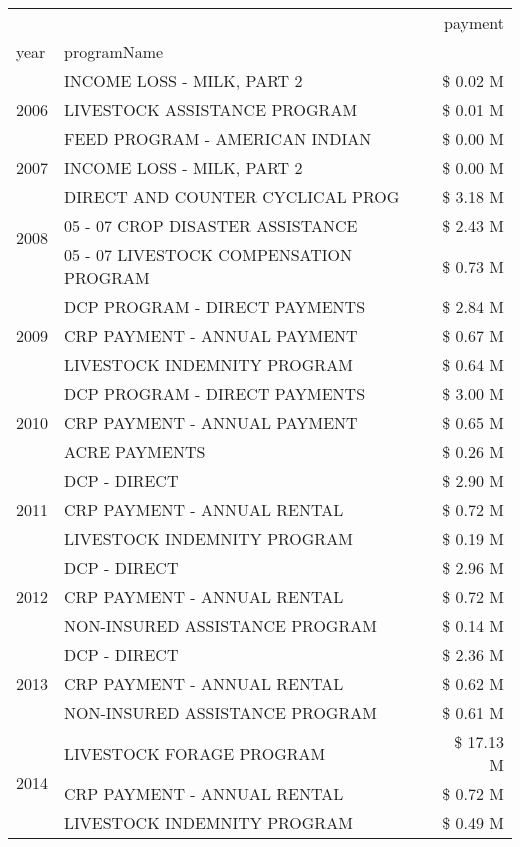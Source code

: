 \begin{tabular}{llr}
\toprule
 &  & payment \\
year & programName &  \\
\midrule
\multirow[t]{3}{*}{2006} & INCOME LOSS - MILK, PART 2 & \$ 0.02 M \\
 & LIVESTOCK ASSISTANCE PROGRAM & \$ 0.01 M \\
 & FEED PROGRAM - AMERICAN INDIAN & \$ 0.00 M \\
\cline{1-3}
2007 & INCOME LOSS - MILK, PART 2 & \$ 0.00 M \\
\cline{1-3}
\multirow[t]{3}{*}{2008} & DIRECT AND COUNTER CYCLICAL PROG & \$ 3.18 M \\
 & 05 - 07 CROP DISASTER ASSISTANCE & \$ 2.43 M \\
 & 05 - 07 LIVESTOCK COMPENSATION PROGRAM & \$ 0.73 M \\
\cline{1-3}
\multirow[t]{3}{*}{2009} & DCP PROGRAM - DIRECT PAYMENTS & \$ 2.84 M \\
 & CRP PAYMENT - ANNUAL PAYMENT & \$ 0.67 M \\
 & LIVESTOCK INDEMNITY PROGRAM & \$ 0.64 M \\
\cline{1-3}
\multirow[t]{3}{*}{2010} & DCP PROGRAM - DIRECT PAYMENTS & \$ 3.00 M \\
 & CRP PAYMENT - ANNUAL PAYMENT & \$ 0.65 M \\
 & ACRE PAYMENTS & \$ 0.26 M \\
\cline{1-3}
\multirow[t]{3}{*}{2011} & DCP - DIRECT & \$ 2.90 M \\
 & CRP PAYMENT - ANNUAL RENTAL & \$ 0.72 M \\
 & LIVESTOCK INDEMNITY PROGRAM & \$ 0.19 M \\
\cline{1-3}
\multirow[t]{3}{*}{2012} & DCP - DIRECT & \$ 2.96 M \\
 & CRP PAYMENT - ANNUAL RENTAL & \$ 0.72 M \\
 & NON-INSURED ASSISTANCE PROGRAM & \$ 0.14 M \\
\cline{1-3}
\multirow[t]{3}{*}{2013} & DCP - DIRECT & \$ 2.36 M \\
 & CRP PAYMENT - ANNUAL RENTAL & \$ 0.62 M \\
 & NON-INSURED ASSISTANCE PROGRAM & \$ 0.61 M \\
\cline{1-3}
\multirow[t]{3}{*}{2014} & LIVESTOCK FORAGE PROGRAM & \$ 17.13 M \\
 & CRP PAYMENT - ANNUAL RENTAL & \$ 0.72 M \\
 & LIVESTOCK INDEMNITY PROGRAM & \$ 0.49 M \\

\end{tabular}
